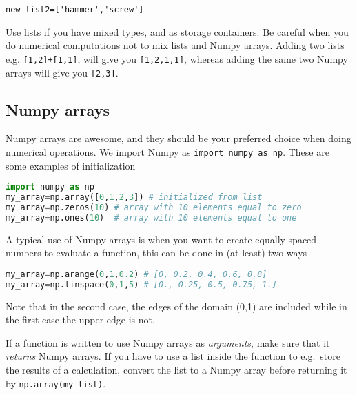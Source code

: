\documentclass[graybox,sectrefs,envcountresetchap,open=right,final]{svmonodo}
\newenvironment{graybox2admon}[1][]{
\begin{graybox2mdframed}[frametitle=#1]
}
{
\end{graybox2mdframed}
}
\begin{document}
\Verb!new_list2=['hammer','screw']!



\begin{graybox2admon}[When to use lists]
Use lists if you have mixed types, and as storage containers. Be careful when you do numerical computations not to mix lists and Numpy arrays. Adding two lists e.g. \texttt{[1,2]+[1,1]}, will give you \texttt{[1,2,1,1]}, whereas adding the same two Numpy arrays will give you \texttt{[2,3]}.
\end{graybox2admon}




\subsection{Numpy arrays}
Numpy arrays are awesome, and they should be your preferred choice when doing numerical operations. We import Numpy as \texttt{import numpy as np}. These are some examples of initialization





\begin{lstlisting}[language=python,style=blue1bar]
import numpy as np
my_array=np.array([0,1,2,3]) # initialized from list
my_array=np.zeros(10) # array with 10 elements equal to zero
my_array=np.ones(10)  # array with 10 elements equal to one

\end{lstlisting}

A typical use of Numpy arrays is when you want to create equally spaced numbers to evaluate a function, this can be done in (at least) two ways



\begin{lstlisting}[language=python,style=blue1bar]
my_array=np.arange(0,1,0.2) # [0, 0.2, 0.4, 0.6, 0.8]
my_array=np.linspace(0,1,5) # [0., 0.25, 0.5, 0.75, 1.]

\end{lstlisting}

Note that in the second case, the edges of the domain (0,1) are included while in the first case the upper edge is not. 



\begin{graybox2admon}[Do not mix Numpy arrays and lists in functions]
If a function is written to use  Numpy arrays as \emph{arguments}, make sure that it \emph{returns} Numpy arrays. If you have to use a list inside the function to e.g.~store the results of a calculation, convert the list to a Numpy array before returning it by \Verb!np.array(my_list)!.
\end{graybox2admon}
\end{document}
